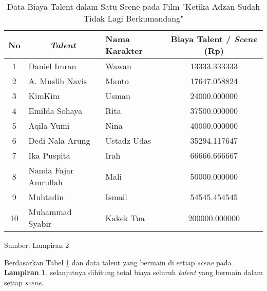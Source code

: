 {    \begin{table}
        \centering
        \caption{Data Biaya Talent dalam Satu Scene pada Film "Ketika Adzan Sudah Tidak Lagi Berkumandang"}
        \label{tab: data biaya talent}
        \begin{tabular}{|c|l|l|c|}
            \hline
            \textbf{No} & \multicolumn{1}{c|}{\textit{\textbf{Talent}}} & \textbf{Nama Karakter} & \textbf{Biaya Talent / \textit{Scene} (Rp)} \\ \hline
            1           & Daniel Imran                                  & Wawan                  & 13333.333333                                \\ \hline
            2           & A. Muslih Navis                               & Manto                  & 17647.058824                                \\ \hline
            3           & KimKim                                        & Usman                  & 24000.000000                                \\ \hline
            4           & Emilda Sohaya                                 & Rita                   & 37500.000000                                \\ \hline
            5           & Aqila Yumi                                    & Nina                   & 40000.000000                                \\ \hline
            6           & Dedi Nala Arung                               & Ustadz Udas            & 35294.117647                                \\ \hline
            7           & Ika Puspita                                   & Irah                   & 66666.666667                                \\ \hline
            8           & Nanda Fajar Amrullah                          & Mali                   & 50000.000000                                \\ \hline
            9           & Muhtadin                                      & Ismail                 & 54545.454545                                \\ \hline
            10          & Muhammad Syabir                               & Kakek Tua              & 200000.000000                               \\ \hline
        \end{tabular}
    \end{table}

    \vspace{-8mm}
    \begin{flushright}
        Sumber: Lampiran 2
    \end{flushright}

    Berdasarkan Tabel \ref{tab: data biaya talent} dan data talent yang bermain di setiap \textit{scene} pada \textbf{Lampiran 1}, selanjutnya dihitung total biaya seluruh \textit{talent} yang bermain dalam setiap \textit{scene}.
    
    



}

\pagebreak